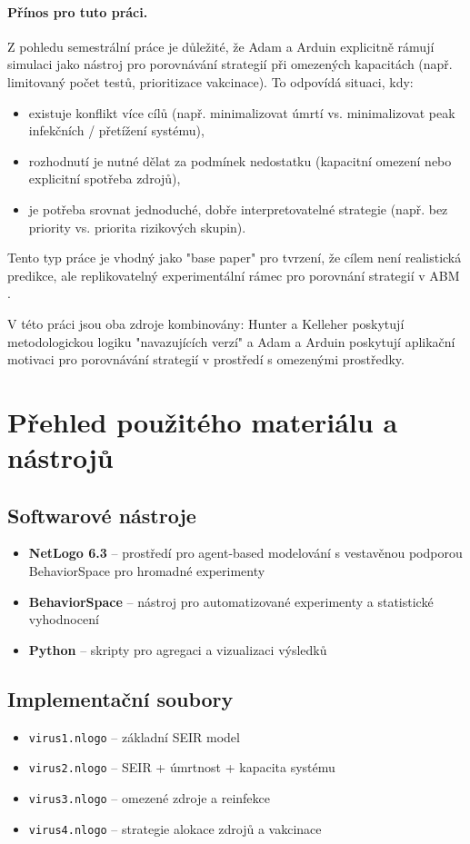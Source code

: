 \documentclass{article}
\begin{document}
\paragraph{Přínos pro tuto práci.} Z pohledu semestrální práce je důležité, že Adam a Arduin explicitně rámují simulaci jako nástroj pro porovnávání strategií při omezených kapacitách (např. limitovaný počet testů, prioritizace vakcinace). To odpovídá situaci, kdy:
\begin{itemize}
\item existuje konflikt více cílů (např. minimalizovat úmrtí vs. minimalizovat peak infekčních / přetížení systému),
\item rozhodnutí je nutné dělat za podmínek nedostatku (kapacitní omezení nebo explicitní spotřeba zdrojů),
\item je potřeba srovnat jednoduché, dobře interpretovatelné strategie (např. bez priority vs. priorita rizikových skupin).
\end{itemize}
Tento typ práce je vhodný jako "base paper" pro tvrzení, že cílem není realistická predikce, ale replikovatelný experimentální rámec pro porovnání strategií v ABM \cite{adam-arduin-2022}.

V této práci jsou oba zdroje kombinovány: Hunter a Kelleher poskytují metodologickou logiku "navazujících verzí" a Adam a Arduin poskytují aplikační motivaci pro porovnávání strategií v prostředí s omezenými prostředky.

\section{Přehled použitého materiálu a nástrojů}

\subsection{Softwarové nástroje}
\begin{itemize}
\item \textbf{NetLogo 6.3} -- prostředí pro agent-based modelování s vestavěnou podporou BehaviorSpace pro hromadné experimenty
\item \textbf{BehaviorSpace} -- nástroj pro automatizované experimenty a statistické vyhodnocení
\item \textbf{Python} -- skripty pro agregaci a vizualizaci výsledků
\end{itemize}

\subsection{Implementační soubory}
\begin{itemize}
\item \texttt{virus1.nlogo} -- základní SEIR model
\item \texttt{virus2.nlogo} -- SEIR + úmrtnost + kapacita systému
\item \texttt{virus3.nlogo} -- omezené zdroje a reinfekce
\item \texttt{virus4.nlogo} -- strategie alokace zdrojů a vakcinace
\end{itemize}
\end{document}
